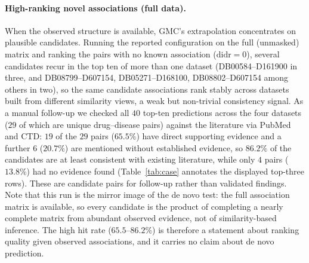 \documentclass[webpdf,modern,large]{oup-authoring-template}
\begin{document}
\paragraph{High-ranking novel associations (full data).} When the observed structure is available, GMC's extrapolation concentrates on plausible candidates. Running the reported configuration on the full (unmasked) matrix and ranking the pairs with no known association ($\mathrm{didr}=0$), several candidates recur in the top ten of more than one dataset (DB00584--D161900 in three, and DB08799--D607154, DB05271--D168100, DB08802--D607154 among others in two), so the same candidate associations rank stably across datasets built from different similarity views, a weak but non-trivial consistency signal. As a manual follow-up we checked all $40$ top-ten predictions across the four datasets ($29$ of which are unique drug--disease pairs) against the literature via PubMed and CTD: $19$ of the $29$ pairs ($65.5\%$) have direct supporting evidence and a further $6$ ($20.7\%$) are mentioned without established evidence, so $86.2\%$ of the candidates are at least consistent with existing literature, while only $4$ pairs ($13.8\%$) had no evidence found (Table~\ref{tab:case} annotates the displayed top-three rows). These are candidate pairs for follow-up rather than validated findings. Note that this run is the mirror image of the de novo test: the full association matrix is available, so every candidate is the product of completing a nearly complete matrix from abundant observed evidence, not of similarity-based inference. The high hit rate ($65.5$--$86.2\%$) is therefore a statement about ranking quality given observed associations, and it carries no claim about de novo prediction.

\end{document}
